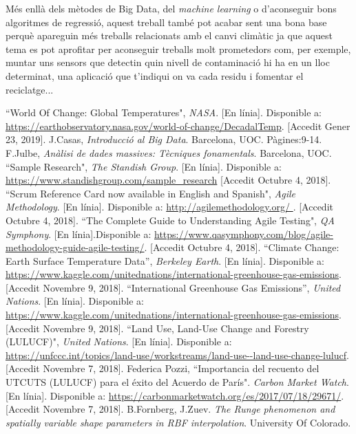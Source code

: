 \documentclass[10pt,a4paper,twocolumn,twoside]{article}
\begin{document}
Més enllà dels mètodes de Big Data, del \textit{machine learning} o d'aconseguir bons algoritmes de regressió, aquest treball també pot acabar sent una bona base perquè apareguin més treballs relacionats amb el canvi climàtic ja que aquest tema es pot aprofitar per aconseguir treballs molt prometedors com, per exemple, muntar uns sensors que detectin quin nivell de contaminació hi ha en un lloc determinat, una aplicació que t'indiqui on va cada residu i fomentar el reciclatge...


\begin{thebibliography}{11}
``World Of Change: Global Temperatures", \textit{NASA}. [En línia]. Disponible a: \url{https://earthobservatory.nasa.gov/world-of-change/DecadalTemp}. [Accedit Gener 23, 2019].
J.Casas, \textit{Introducció al Big Data}. Barcelona, UOC. Pàgines:9-14.
F.Julbe, \textit{Anàlisi de dades massives: Tècniques fonamentals}. Barcelona, UOC.
``Sample Research", \textit{The Standish Group}. [En línia]. Disponible a: \url{https://www.standishgroup.com/sample_research} [Accedit Octubre 4, 2018].
``Scrum Reference Card now available in English and Spanish",  \textit{Agile Methodology}. [En línia]. Disponible a: \url{http://agilemethodology.org/ }. [Accedit Octubre 4, 2018].
``The Complete Guide to Understanding Agile Testing", \textit{QA Symphony}. [En línia].Disponible a: \url{https://www.qasymphony.com/blog/agile-methodology-guide-agile-testing/}. [Accedit Octubre 4, 2018].
``Climate Change: Earth Surface Temperature Data”, \textit{Berkeley Earth}. [En línia]. Disponible a: \url{ https://www.kaggle.com/unitednations/international-greenhouse-gas-emissions}. [Accedit Novembre 9, 2018].
 ``International Greenhouse Gas Emissions”, \textit{United Nations}. [En línia]. Disponible a: \url{ https://www.kaggle.com/unitednations/international-greenhouse-gas-emissions}. [Accedit Novembre 9, 2018].
 ``Land Use, Land-Use Change and Forestry (LULUCF)", \textit{United Nations}. [En línia]. Disponible a: \url{ https://unfccc.int/topics/land-use/workstreams/land-use--land-use-change-lulucf}. [Accedit Novembre 7, 2018].
Federica Pozzi, ``Importancia del recuento del UTCUTS (LULUCF) para el éxito del Acuerdo de París". \textit{Carbon Market Watch}. [En línia]. Disponible a: \url{https://carbonmarketwatch.org/es/2017/07/18/29671/}. [Accedit Novembre 7, 2018].
B.Fornberg, J.Zuev. \textit{The Runge phenomenon and spatially variable shape parameters in RBF interpolation}. University Of Colorado.

\end{thebibliography}
\end{document}
